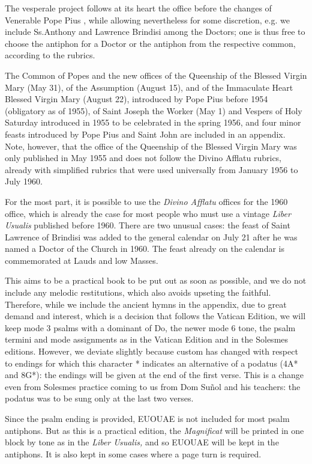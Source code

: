 \begin{enpars}
The vesperale project follows at its heart the office before the changes of Venerable Pope Pius , while allowing nevertheless for some discretion, e.g. we include Ss.\@ Anthony and Lawrence Brindisi among the Doctors; one is thus free to choose the antiphon for a Doctor or the antiphon from the respective common, according to the rubrics.

The Common of Popes and the new offices of the Queenship of the Blessed Virgin Mary (May 31), of the Assumption (August 15), and of the Immaculate Heart Blessed Virgin Mary (August 22), introduced by Pope Pius  before 1954 (obligatory as of 1955), of Saint Joseph the Worker (May 1) and Vespers of Holy Saturday introduced in 1955 to be celebrated in the spring 1956, and four minor feasts introduced by Pope Pius  and Saint John  are included in an appendix. Note, however, that the office of the Queenship of the Blessed Virgin Mary was only published in May 1955 and does not follow the Divino Afflatu rubrics, already with simplified rubrics that were used universally from January 1956 to July 1960.

For the most part, it is possible to use the \textit{Divino Afflatu} offices for the 1960 office, which is already the case for most people who must use a vintage \textit{Liber Usualis} published before 1960. There are two unusual cases: the feast of Saint Lawrence of Brindisi was added to the general calendar on July 21 after he was named a Doctor of the Church in 1960. The feast already on the calendar is commemorated at Lauds and low Masses.

This aims to be a practical book to be put out as soon as possible, and we do not include any melodic restitutions, which also avoids upseting the faithful. Therefore, while we include the ancient hymns in the appendix, due to great demand and interest, which is a decision that follows the Vatican Edition, we will keep mode 3 psalms with a dominant of Do, the newer mode 6 tone, the psalm termini and mode assignments as in the Vatican Edition and in the Solesmes editions. However, we deviate slightly because custom has changed with respect to endings for which this character * indicates an alternative of a podatus (4A* and 8G*): the endings will be given at the end of the first verse. This is a change even from Solesmes practice coming to us from Dom Suñol and his teachers: the podatus was to be sung only at the last two verses.

Since the psalm ending is provided, EUOUAE is not included for most psalm antiphons. But as this is a practical edition, the \textit{Magnificat} will be printed in one block by tone as in the \textit{Liber Usualis,} and so EUOUAE will be kept in the antiphons. It is also kept in some cases where a page turn is required.


\end{enpars}
